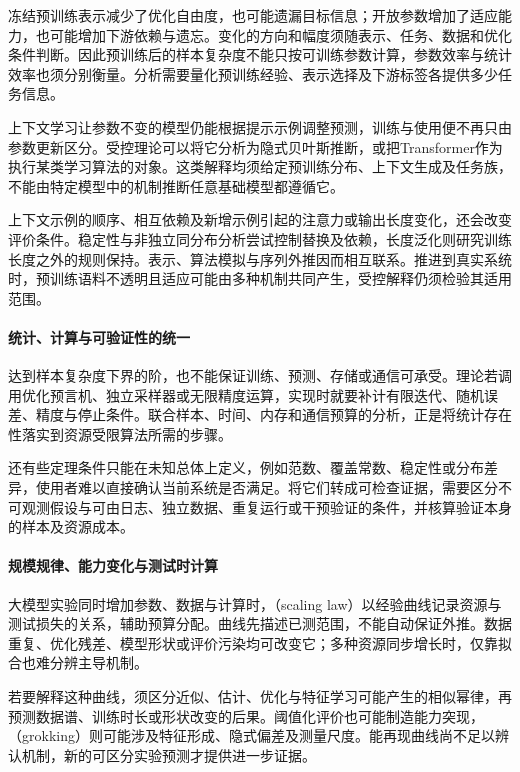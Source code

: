 冻结预训练表示减少了优化自由度，也可能遗漏目标信息；开放参数增加了适应能力，也可能增加下游依赖与遗忘。变化的方向和幅度须随表示、任务、数据和优化条件判断。因此预训练后的样本复杂度不能只按可训练参数计算，参数效率与统计效率也须分别衡量。分析需要量化预训练经验、表示选择及下游标签各提供多少任务信息。

上下文学习让参数不变的模型仍能根据提示示例调整预测，训练与使用便不再只由参数更新区分。受控理论可以将它分析为隐式贝叶斯推断，或把Transformer作为执行某类学习算法的对象。这类解释均须给定预训练分布、上下文生成及任务族，不能由特定模型中的机制推断任意基础模型都遵循它。

上下文示例的顺序、相互依赖及新增示例引起的注意力或输出长度变化，还会改变评价条件。稳定性与非独立同分布分析尝试控制替换及依赖，长度泛化则研究训练长度之外的规则保持。表示、算法模拟与序列外推因而相互联系。推进到真实系统时，预训练语料不透明且适应可能由多种机制共同产生，受控解释仍须检验其适用范围。

\paragraph{统计、计算与可验证性的统一}

达到样本复杂度下界的阶，也不能保证训练、预测、存储或通信可承受。理论若调用优化预言机、独立采样器或无限精度运算，实现时就要补计有限迭代、随机误差、精度与停止条件。联合样本、时间、内存和通信预算的分析，正是将统计存在性落实到资源受限算法所需的步骤。

还有些定理条件只能在未知总体上定义，例如范数、覆盖常数、稳定性或分布差异，使用者难以直接确认当前系统是否满足。将它们转成可检查证据，需要区分不可观测假设与可由日志、独立数据、重复运行或干预验证的条件，并核算验证本身的样本及资源成本。

\paragraph{规模规律、能力变化与测试时计算}

大模型实验同时增加参数、数据与计算时，（scaling law）以经验曲线记录资源与测试损失的关系，辅助预算分配。曲线先描述已测范围，不能自动保证外推。数据重复、优化残差、模型形状或评价污染均可改变它；多种资源同步增长时，仅靠拟合也难分辨主导机制。

若要解释这种曲线，须区分近似、估计、优化与特征学习可能产生的相似幂律，再预测数据谱、训练时长或形状改变的后果。阈值化评价也可能制造能力突现，（grokking）则可能涉及特征形成、隐式偏差及测量尺度。能再现曲线尚不足以辨认机制，新的可区分实验预测才提供进一步证据。

